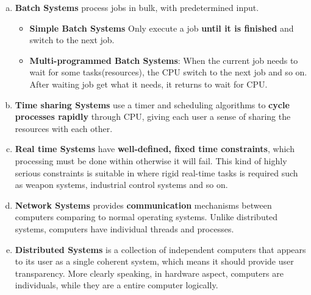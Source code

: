 \documentclass[11pt]{article}
\begin{document}
    \begin{enumerate}[a.]
        \item \textbf{Batch Systems} process jobs in bulk, with predetermined input.
            \begin{itemize}
                \item \textbf{Simple Batch Systems} Only execute a job \textbf{until it is finished} and switch to the next job. 
                \item \textbf{Multi-programmed Batch Systems}: When the current job needs to wait for some tasks(resources), the CPU 
                    switch to the next job and so on. After waiting job get what it needs, it returns to wait for CPU.
            \end{itemize}
        \item \textbf{Time sharing Systems} use a timer and scheduling algorithms to \textbf{cycle processes rapidly} through CPU, giving each 
            user a sense of sharing the resources with each other.
        \item \textbf{Real time Systems} have \textbf{well-defined, fixed time constraints}, which processing must be done within 
        otherwise it will fail. This kind of highly serious constraints is suitable in where rigid real-time tasks is required 
        such as weapon systems, industrial control systems and so on.
        \item \textbf{Network Systems} provides \textbf{communication} mechanisms between computers comparing to normal operating systems.
            Unlike distributed systems, computers have individual threads and processes.
        \item \textbf{Distributed Systems} is a collection of independent computers that appears to its user as a single coherent 
            system, which means it should provide user transparency.
            More clearly speaking, in hardware aspect, computers are individuals, while they are a entire computer logically.
    \end{enumerate}
\end{document}
